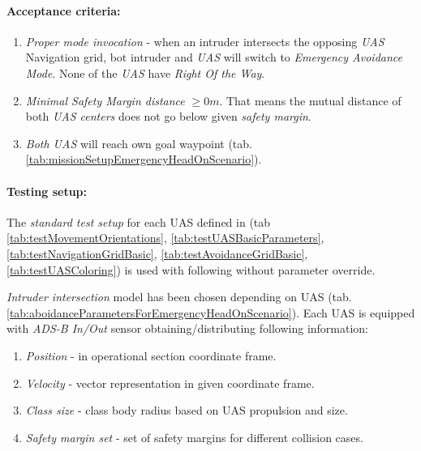 \paragraph{Acceptance criteria:} 
\begin{enumerate}
    \item\emph{Proper mode invocation} - when an intruder intersects the opposing \emph{UAS} Navigation grid, bot intruder and \emph{UAS} will switch to \emph{Emergency Avoidance Mode}. None of the \emph{UAS} have \emph{Right Of the Way}.
    
    \item\emph{Minimal Safety Margin distance} $\ge 0m$. That means the mutual distance of both \emph{UAS centers} does not go below given \emph{safety margin}.
    
    \item\emph{Both UAS} will reach own goal waypoint (tab. \ref{tab:missionSetupEmergencyHeadOnScenario}).

\end{enumerate}

\paragraph{Testing setup:} The \emph{standard test setup} for each UAS defined in (tab \ref{tab:testMovementOrientations}, \ref{tab:testUASBasicParameters}, \ref{tab:testNavigationGridBasic}, \ref{tab:testAvoidanceGridBasic}, \ref{tab:testUASColoring}) is used with following without parameter override.

\emph{Intruder intersection} model has been chosen depending on UAS (tab. \ref{tab:aboidanceParametersForEmergencyHeadOnScenario}). Each UAS is equipped with \emph{ADS-B In/Out} sensor obtaining/distributing following information:

\begin{enumerate}
    \item \emph{Position} - in operational section coordinate frame.
    
    \item \emph{Velocity} - vector representation in given coordinate frame.
    
    \item \emph{Class size} - class body radius based on UAS propulsion and size.
    
    \item \emph{Safety margin set} - set of safety margins for different collision cases.
\end{enumerate}

